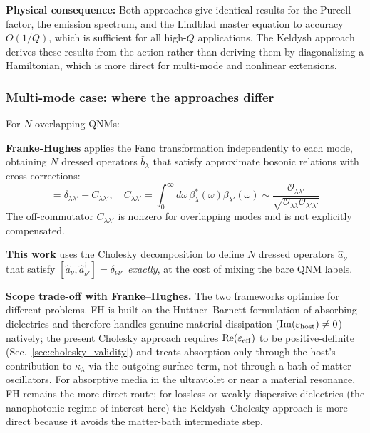 \documentclass[12pt]{article}
\begin{document}
\textbf{Physical consequence:} Both approaches give identical results for
the Purcell factor, the emission spectrum, and the Lindblad master equation
to accuracy $O(1/Q)$, which is sufficient for all high-$Q$ applications.
The Keldysh approach derives these results from the action rather than
deriving them by diagonalizing a Hamiltonian, which is more direct for
multi-mode and nonlinear extensions.

\subsubsection*{Multi-mode case: where the approaches differ}

For $N$ overlapping QNMs:

\textbf{Franke-Hughes} applies the Fano transformation independently to
each mode, obtaining $N$ dressed operators $\hat{b}_\lambda$ that satisfy
approximate bosonic relations with cross-corrections:
\begin{equation}
  [\hat{b}_\lambda,\hat{b}_{\lambda'}^\dagger]
  = \delta_{\lambda\lambda'} - C_{\lambda\lambda'},\quad
  C_{\lambda\lambda'} =
  \int_0^\infty\!\!d\omega\,\beta_\lambda^*(\omega)\beta_{\lambda'}(\omega)
  \sim \frac{\mathcal{O}_{\lambda\lambda'}}{\sqrt{\mathcal{O}_{\lambda\lambda}
  \mathcal{O}_{\lambda'\lambda'}}}
\end{equation}
The off-commutator $C_{\lambda\lambda'}$ is nonzero for overlapping modes
and is not explicitly compensated.

\textbf{This work} uses the Cholesky decomposition to define $N$ dressed
operators $\hat{a}_\nu$ that satisfy $[\hat{a}_\nu,\hat{a}_{\nu'}^\dagger]
=\delta_{\nu\nu'}$ \emph{exactly}, at the cost of mixing the bare QNM
labels.

\textbf{Scope trade-off with Franke--Hughes.} The two frameworks
optimise for different problems.  FH is built on the Huttner--Barnett
formulation of absorbing dielectrics and therefore handles genuine
material dissipation ($\mathrm{Im}(\varepsilon_{\rm host})\neq 0$)
natively; the present Cholesky approach requires
$\mathrm{Re}(\varepsilon_{\rm eff})$ to be positive-definite
(Sec.~\ref{sec:cholesky_validity}) and treats absorption only through
the host's contribution to $\kappa_\lambda$ via the outgoing surface
term, not through a bath of matter oscillators.  For absorptive media
in the ultraviolet or near a material resonance, FH remains the more
direct route; for lossless or weakly-dispersive dielectrics (the
nanophotonic regime of interest here) the Keldysh--Cholesky approach
is more direct because it avoids the matter-bath intermediate step.
\end{document}
